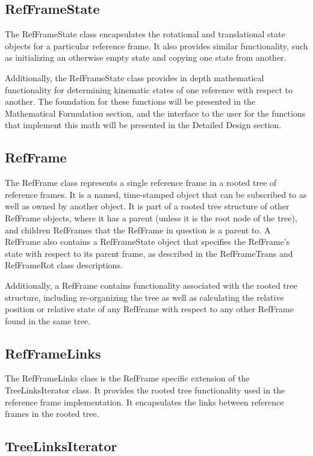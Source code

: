 \subsection{RefFrameState}

The RefFrameState class encapsulates the rotational and translational state
objects for a particular reference frame. It also provides similar functionality,
such as initializing an otherwise empty state and copying one state from
another.

Additionally, the RefFrameState class provides in depth mathematical
functionality for determining kinematic states of one reference with respect
to another. The foundation for these functions will be presented in the
Mathematical Formulation section, and the interface to the user for the functions
that implement this math will be presented in the Detailed Design section.

\subsection{RefFrame}

The RefFrame class represents a single reference frame in a rooted tree
of reference frames. It is a named, time-stamped object that can
be subscribed to as well as owned by another object. It is part of a rooted
tree structure of other RefFrame objects, where it has a parent (unless it
is the root node of the tree), and children RefFrames that the RefFrame
in question is a parent to. A RefFrame also contains a RefFrameState
object that specifies the RefFrame's state with respect to its parent frame,
as described in the RefFrameTrans and RefFrameRot class descriptions.

Additionally, a RefFrame contains functionality associated with the rooted
tree structure, including re-organizing the tree as well as calculating
the relative position or relative state of any RefFrame with respect to any
other RefFrame found in the same tree.

\subsection{RefFrameLinks}

The RefFrameLinks class is the RefFrame specific extension of the
TreeLinksIterator class. It provides the rooted tree functionality used in the
reference frame implementation. It encapsulates the links between reference
frames in the rooted tree.

\subsection{TreeLinksIterator}

